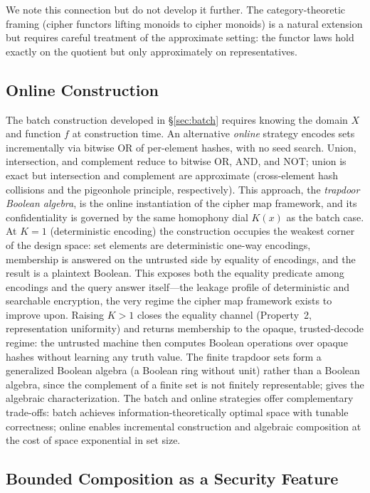 \documentclass[11pt]{article}
\theoremstyle{definition}
\theoremstyle{plain}
\theoremstyle{remark}
\begin{document}
We note this connection but do not develop it further.  The category-theoretic
framing (cipher functors lifting monoids to cipher monoids) is a natural
extension but requires careful treatment of the approximate setting: the
functor laws hold exactly on the quotient but only approximately on
representatives.

\subsection{Online Construction}
\label{subsec:online}

The batch construction developed in \S\ref{sec:batch} requires knowing the
domain $X$ and function $f$ at construction time.  An alternative
\emph{online} strategy encodes sets incrementally via bitwise OR of
per-element hashes, with no seed search.  Union, intersection, and
complement reduce to bitwise OR, AND, and NOT; union is exact but
intersection and complement are approximate (cross-element hash collisions
and the pigeonhole principle, respectively).  This approach, the
\emph{trapdoor Boolean algebra}, is the online instantiation of the cipher
map framework, and its confidentiality is governed by the same homophony
dial $K(x)$ as the batch case.  At $K = 1$ (deterministic encoding) the
construction occupies the weakest corner of the design space: set elements
are deterministic one-way encodings, membership is answered on the untrusted
side by equality of encodings, and the result is a plaintext Boolean.  This
exposes both the equality predicate among encodings and the query answer
itself---the leakage profile of deterministic and searchable encryption, the
very regime the cipher map framework exists to improve upon.  Raising
$K > 1$ closes the equality channel (Property~2, representation uniformity)
and returns membership to the opaque, trusted-decode regime: the untrusted
machine then computes Boolean operations over opaque hashes without learning
any truth value.  The finite trapdoor sets form a generalized Boolean
algebra (a Boolean ring without unit) rather than a Boolean algebra, since
the complement of a finite set is not finitely representable;
\cite{towell2026algebraic} gives the algebraic characterization.  The batch
and online strategies offer complementary trade-offs: batch achieves
information-theoretically optimal space with tunable correctness; online
enables incremental construction and algebraic composition at the cost of
space exponential in set size.

\subsection{Bounded Composition as a Security Feature}
\label{subsec:bounded-composition}
\end{document}
